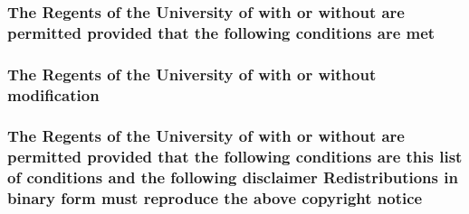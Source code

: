 \hypertarget{_l_i_c_e_n_s_e_add0ececc6159b5bcb7b96a52b306b3b9}{
\subsubsection[{met}]{\setlength{\rightskip}{0pt plus 5cm}The Regents of the University of with or without are permitted provided that the following conditions are met}}\label{_l_i_c_e_n_s_e_add0ececc6159b5bcb7b96a52b306b3b9}
\hypertarget{_l_i_c_e_n_s_e_adff118fbbe42e794a943dd26fa67d950}{
\subsubsection[{modification}]{\setlength{\rightskip}{0pt plus 5cm}The Regents of the University of with or without modification}}\label{_l_i_c_e_n_s_e_adff118fbbe42e794a943dd26fa67d950}
\hypertarget{_l_i_c_e_n_s_e_a837635f661210e45c369790de92e1296}{
\subsubsection[{notice}]{\setlength{\rightskip}{0pt plus 5cm}The Regents of the University of with or without are permitted provided that the following conditions are this list of conditions and the following disclaimer Redistributions in binary form must reproduce the above copyright notice}}\label{_l_i_c_e_n_s_e_a837635f661210e45c369790de92e1296}
